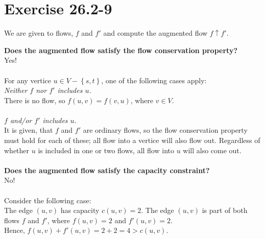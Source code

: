 \section{Exercise 26.2-9}
We are given to flows, $f$ and $f'$ and compute the augmented flow $f\uparrow f'$.

\textbf{Does the augmented flow satisfy the flow conservation property?}
\\
Yes!
\\
\\
For any vertice $u\in V - \left\{s,t\right\}$, one of the following cases apply:
\\
\textit{Neither $f$ nor $f'$ includes $u$.}
\\
There is no flow, so $f(u,v)=f(v,u)$, where $v\in V$.
\\
\\
\textit{$f$ and/or $f'$ includes $u$.}
\\
It is given, that $f$ and $f'$ are ordinary flows, so the flow conservation property must hold for each of these; all flow into a vertice will also flow out. Regardless of whether $u$ is included in one or two flows, all flow into $u$ will also come out.
\\
\\
\textbf{Does the augmented flow satisfy the capacity constraint?}
\\
No!
\\
\\
Consider the following case:
\\
The edge $(u,v)$ has capacity $c(u,v)=2$. The edge $(u,v)$ is part of both flows $f$ and $f'$, where $f(u,v)=2$ and $f'(u,v)=2$.
\\
Hence, $f(u,v)+f'(u,v)=2+2=4>c(u,v)$.